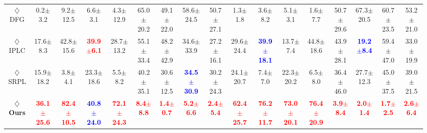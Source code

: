 \begin{table}[tbp]
{\begin{tabular}{@{}c@{\hspace{0.3cm}} cccccccc cccccccc@{}}
$\diamondsuit$ DFG \cite{DFG} & {0.2$\pm$3.2} & 9.2$\pm$12.5 & {6.6$\pm$3.1} & {4.3$\pm$12.9} & {65.0$\pm$20.2} & 49.1$\pm$22.0 & {58.6$\pm$24.5} & {50.7$\pm$27.1} & {1.3$\pm$1.8} & {3.6$\pm$8.2} & {5.1$\pm$3.1} & {1.6$\pm$7.7} & {50.7$\pm$29.6} & 67.3$\pm$20.5 & {60.7$\pm$23.5} & 53.2$\pm$21.0 \\

$\diamondsuit$ IPLC \cite{iplc} & 17.6$\pm$8.3 & 42.8$\pm$15.6 & \textcolor{red}{\textbf{39.9$\pm$6.1}} & 28.7$\pm$13.2 & 55.1$\pm$33.4 & 48.2$\pm$42.9 & 34.6$\pm$33.9 & 27.2$\pm$16.1 & 29.6$\pm$24.4 & \textcolor{blue}{\textbf{39.9$\pm$18.1}} & 13.7$\pm$7.4 & 44.8$\pm$18.6 & 43.9$\pm$28.1 & \textcolor{blue}{\textbf{19.2$\pm$8.4}} & 59.4$\pm$47.0 & 33.0$\pm$19.9 \\

$\diamondsuit$ SRPL \cite{SRPL} & 15.9$\pm$18.2 & 3.8$\pm$4.1 & 23.3$\pm$18.6 & 5.5$\pm$8.2 & 40.2$\pm$35.1 & 30.6$\pm$12.5 & \textcolor{blue}{\textbf{34.5$\pm$30.9}} & 30.2$\pm$24.3 & 24.1$\pm$20.7 & 7.4$\pm$7.0 & 22.3$\pm$20.2 & 6.5$\pm$8.0 & 36.4$\pm$46.0 & 27.7$\pm$12.3 & 45.0$\pm$37.5 & 39.0$\pm$21.5 \\ \midrule

\textbf{$\diamondsuit$ Ours} & \textcolor{red}{\textbf{36.1$\pm$25.6}} & \textcolor{red}{\textbf{82.4$\pm$10.5}} & \textcolor{blue}{\textbf{40.8$\pm$24.0}} & \textcolor{red}{\textbf{72.1$\pm$24.3}}   &\textcolor{red}{\textbf{8.4$\pm$8.8}} & \textcolor{red}{\textbf{1.4$\pm$0.7}} & \textcolor{red}{\textbf{5.2$\pm$6.6}} & \textcolor{red}{\textbf{2.4$\pm$5.4}} & \textcolor{red}{\textbf{62.4$\pm$25.7}} & \textcolor{red}{\textbf{76.2$\pm$11.7}} & \textcolor{red}{\textbf{73.0$\pm$20.1}} & \textcolor{red}{\textbf{76.4$\pm$20.9}} & \textcolor{red}{\textbf{3.9$\pm$8.4}} & \textcolor{red}{\textbf{2.0$\pm$1.4}} & \textcolor{red}{\textbf{1.7$\pm$2.5}} & \textcolor{red}{\textbf{2.6$\pm$6.4}} \\ 

\bottomrule
\end{tabular}%
}
\vspace{-3mm}
\end{table}